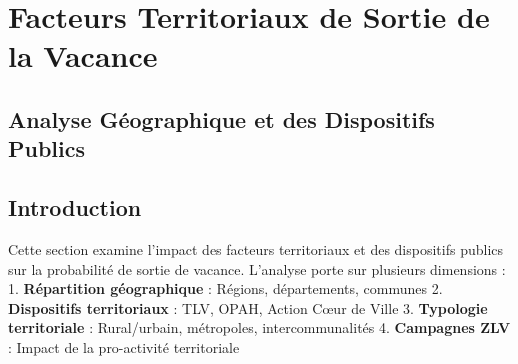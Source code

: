 \documentclass[11pt]{article}
\begin{document}
    

    

    \section{Facteurs Territoriaux de Sortie de la
Vacance}\label{facteurs-territoriaux-de-sortie-de-la-vacance}

\subsection{Analyse Géographique et des Dispositifs
Publics}\label{analyse-guxe9ographique-et-des-dispositifs-publics}

\subsection{Introduction}\label{introduction}

Cette section examine l'impact des facteurs territoriaux et des
dispositifs publics sur la probabilité de sortie de vacance. L'analyse
porte sur plusieurs dimensions : 1. \textbf{Répartition géographique} :
Régions, départements, communes 2. \textbf{Dispositifs territoriaux} :
TLV, OPAH, Action Cœur de Ville 3. \textbf{Typologie territoriale} :
Rural/urbain, métropoles, intercommunalités 4. \textbf{Campagnes ZLV} :
Impact de la pro-activité territoriale
\end{document}
